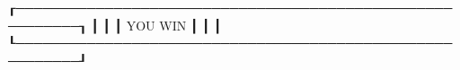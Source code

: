 ┎─────────────────────────────────────────────────────────┒
┃                                                         ┃
┃                         YOU WIN                         ┃
┃                                                         ┃
┖─────────────────────────────────────────────────────────┚